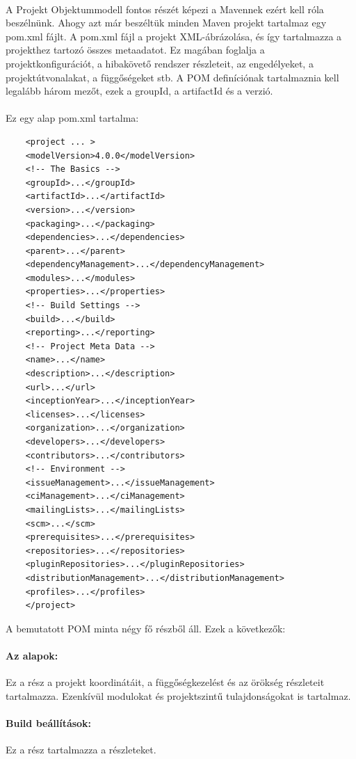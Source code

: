 \paragraph{}
A Projekt Objektummodell fontos részét képezi a Mavennek ezért kell róla beszélnünk.
Ahogy azt már beszéltük minden Maven projekt tartalmaz egy pom.xml fájlt.
A pom.xml fájl a projekt XML-ábrázolása, és így tartalmazza a projekthez tartozó összes metaadatot.
Ez magában foglalja a projektkonfigurációt, a hibakövető rendszer részleteit, az engedélyeket, a projektútvonalakat, a függőségeket stb.
A POM definíciónak tartalmaznia kell legalább három mezőt, ezek a groupId, a artifactId és a verzió.
\pagebreak

\paragraph{}
Ez egy alap pom.xml tartalma:
\begin{lstlisting}
	<project ... >
	<modelVersion>4.0.0</modelVersion>
	<!-- The Basics -->
	<groupId>...</groupId>
	<artifactId>...</artifactId>
	<version>...</version>
	<packaging>...</packaging>
	<dependencies>...</dependencies>
	<parent>...</parent>
	<dependencyManagement>...</dependencyManagement>
	<modules>...</modules>
	<properties>...</properties>
	<!-- Build Settings -->
	<build>...</build>
	<reporting>...</reporting>
	<!-- Project Meta Data -->
	<name>...</name>
	<description>...</description>
	<url>...</url>
	<inceptionYear>...</inceptionYear>
	<licenses>...</licenses>
	<organization>...</organization>
	<developers>...</developers>
	<contributors>...</contributors>
	<!-- Environment -->
	<issueManagement>...</issueManagement>
	<ciManagement>...</ciManagement>
	<mailingLists>...</mailingLists>
	<scm>...</scm>
	<prerequisites>...</prerequisites>
	<repositories>...</repositories>
	<pluginRepositories>...</pluginRepositories>
	<distributionManagement>...</distributionManagement>
	<profiles>...</profiles>
	</project>
\end{lstlisting}

A bemutatott POM minta négy fő részből áll. Ezek a következők:

\paragraph{Az alapok:} Ez a rész a projekt koordinátáit, a függőségkezelést és az örökség részleteit tartalmazza.
Ezenkívül modulokat és projektszintű tulajdonságokat is tartalmaz.
\paragraph{Build beállítások:} Ez a rész tartalmazza a részleteket.
